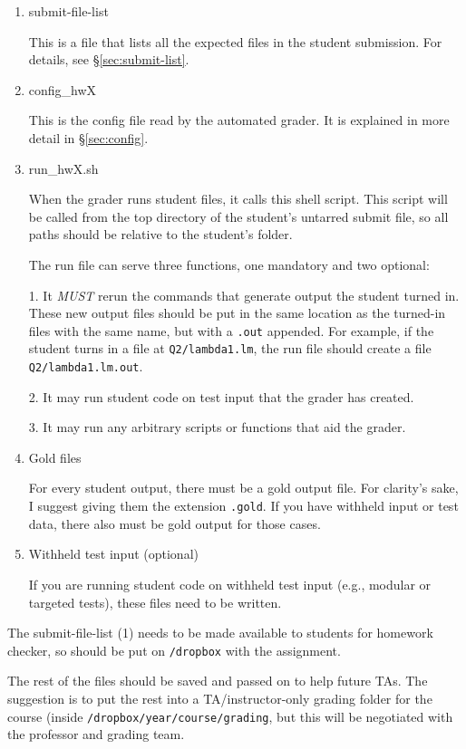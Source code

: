\documentclass[12pt]{article}
\begin{document}
\begin{enumerate}
\item {submit-file-list

This is a file that lists all the expected files in the student submission. For details, see \S\ref{sec:submit-list}.
}
\item {config\_hwX

This is the config file read by the automated grader. It is explained in more detail in \S\ref{sec:config}.
}
\item {run\_hwX.sh

When the grader runs student files, it calls this shell script. This script will be called from the top directory of the student's untarred submit file, so all paths should be relative to the student's folder.

The run file can serve three functions, one mandatory and two optional:

1. It \textit{MUST} rerun the commands that generate output the student turned in. These new output files should be put in the same location as the turned-in files with the same name, but with a \texttt{.out} appended. For example, if the student turns in a file at \texttt{Q2/lambda1.lm}, the run file should create a file \texttt{Q2/lambda1.lm.out}.

2. It may run student code on test input that the grader has created.

3. It may run any arbitrary scripts or functions that aid the grader.
}
\item {Gold files

For every student output, there must be a gold output file. For clarity's sake, I suggest giving them the extension \texttt{.gold}. If you have withheld input or test data, there also must be gold output for those cases.
}
\item {Withheld test input (optional)

If you are running student code on withheld test input (e.g., modular or targeted tests), these files need to be written.

}
\end{enumerate}

The submit-file-list (1) needs to be made available to students for homework checker, so should be put on \texttt{/dropbox} with the assignment.

The rest of the files should be saved and passed on to help future TAs. The suggestion is to put the rest into a TA/instructor-only grading folder for the course (inside \texttt{/dropbox/year/course/grading}, but this will be negotiated with the professor and grading team.
\end{document}
